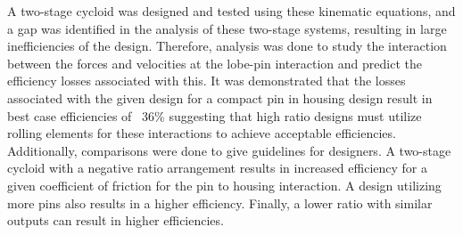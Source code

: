 A two-stage cycloid was designed and tested using these kinematic equations, and a gap was identified in the analysis of these two-stage systems, resulting in large inefficiencies of the design. Therefore, analysis was done to study the interaction between the forces and velocities at the lobe-pin interaction and predict the efficiency losses associated with this. It was demonstrated that the losses associated with the given design for a compact pin in housing design result in best case efficiencies of ~36\% suggesting that high ratio designs must utilize rolling elements for these interactions to achieve acceptable efficiencies. Additionally, comparisons were done to give guidelines for designers. A two-stage cycloid with a negative ratio arrangement results in increased efficiency for a given coefficient of friction for the pin to housing interaction. A design utilizing more pins also results in a higher efficiency. Finally, a lower ratio with similar outputs can result in higher efficiencies. 


